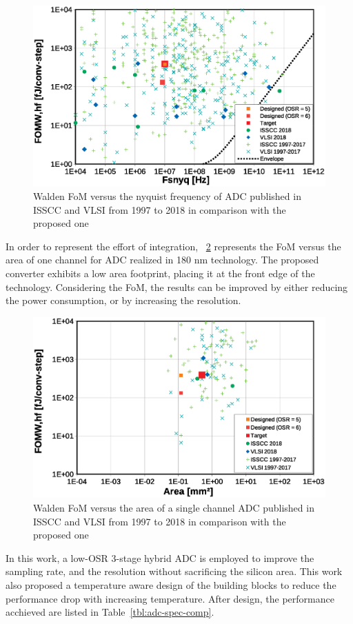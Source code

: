 \begin{figure}[htp]
    \centering
    \includegraphics[width=.75\textwidth]{Chapter5/Figs/adc_chip/walden-fom-2018-designed.eps}
    \caption{Walden FoM versus the nyquist frequency of ADC published in ISSCC and VLSI from 1997 to 2018 in comparison with the proposed one}
    \label{fig:walden-fom-comparison-designed}
\end{figure}

In order to represent the effort of integration, \figurename~\ref{fig:walden-area-fom-comparison-designed} represents the FoM versus the area of one channel for ADC realized in 180 nm technology. The proposed converter exhibits a low area footprint, placing it at the front edge of the technology. Considering the FoM, the results can be improved by either reducing the power consumption, or by increasing the resolution.

\begin{figure}[htp]
    \centering
    \includegraphics[width=.75\textwidth]{Chapter5/Figs/adc_chip/walden-fom-area-180nm.eps}
    \caption{Walden FoM versus the area of a single channel ADC published in ISSCC and VLSI from 1997 to 2018 in comparison with the proposed one}
    \label{fig:walden-area-fom-comparison-designed}
\end{figure}

In this work, a low-OSR 3-stage hybrid ADC is employed to improve the sampling rate, and the resolution without sacrificing the silicon area. This work also proposed a temperature aware design of the building blocks to reduce the performance drop with increasing temperature. After design, the performance acchieved are listed in Table~\ref{tbl:adc-spec-comp}.

